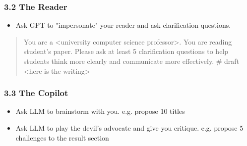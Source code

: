 \documentclass{beamer}
\begin{document}
\begin{frame}
\frametitle{3.2 The Reader}
\begin{itemize}
    \item Ask GPT to "impersonate" your reader and ask clarification questions.
\end{itemize}
\begin{quote}
    You are a <university computer science professor>. You are reading student's paper. \newline
    Please ask at least 5 clarification questions to help students think more clearly and communicate more effectively.
    \newline
    \# draft \newline
    <here is the writing>
\end{quote}
\end{frame}   


\begin{frame}
  \frametitle{3.3 The Copilot}
  \begin{itemize}
      \item Ask LLM to brainstorm with you. e.g. propose 10 titles
      \item Ask LLM to play the devil's advocate and give you critique. e.g. propose 5 challenges to the result section
  \end{itemize}
\end{frame}   
\end{document}
